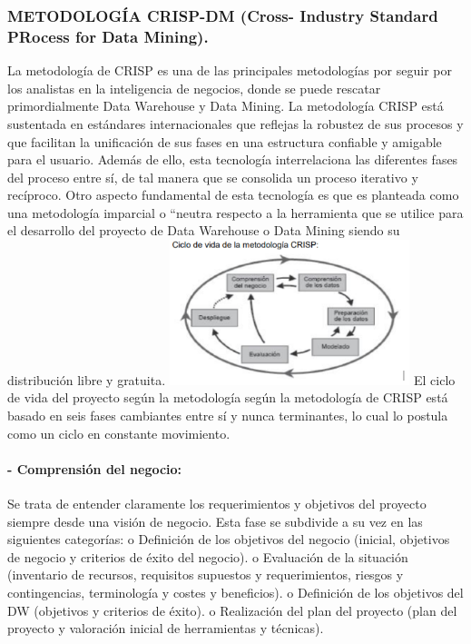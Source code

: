 \documentclass[twoside,twocolumn]{article}
\begin{document}
\subsubsection{METODOLOGÍA CRISP-DM (Cross- Industry Standard PRocess for Data Mining). }
La metodología de CRISP es una de las principales metodologías por seguir por 
los analistas en la inteligencia de negocios, donde se puede rescatar 
primordialmente Data Warehouse y Data Mining. 
La metodología CRISP está sustentada en estándares internacionales que reflejas 
la robustez de sus procesos y que facilitan la unificación de sus fases en una 
estructura confiable y amigable para el usuario. Además de ello, esta tecnología 
interrelaciona las diferentes fases del proceso entre sí, de tal manera que se 
consolida un proceso iterativo y recíproco. Otro aspecto fundamental de esta 
tecnología es que es planteada como una metodología imparcial o “neutra 
respecto a la herramienta que se utilice para el desarrollo del proyecto de Data 
Warehouse o Data Mining siendo su distribución libre y gratuita. 
\includegraphics[width=7cm]{imagenes/img3.png}
El ciclo de vida del proyecto según la metodología según la metodología 
de CRISP está basado en seis fases cambiantes entre sí y nunca 
terminantes, lo cual lo postula como un ciclo en constante movimiento. 

\paragraph{- Comprensión del negocio:}
Se trata de entender claramente los 
requerimientos y objetivos del proyecto siempre desde una visión de 
negocio. Esta fase se subdivide a su vez en las siguientes categorías: 
o Definición de los objetivos del negocio (inicial, objetivos de 
negocio y criterios de éxito del negocio). 
o Evaluación de la situación (inventario de recursos, requisitos 
supuestos y requerimientos, riesgos y contingencias, terminología 
y costes y beneficios). 
o Definición de los objetivos del DW (objetivos y criterios de éxito). 
o Realización del plan del proyecto (plan del proyecto y valoración 
inicial de herramientas y técnicas). 
\end{document}
